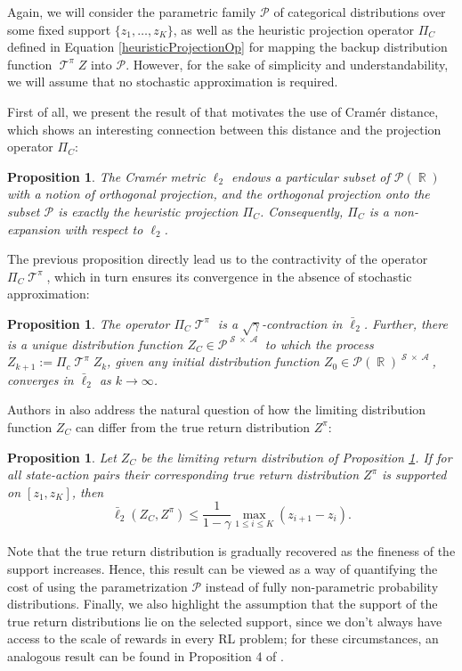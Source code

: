 \documentclass[12pt,a4paper,openright,twoside]{article}
\DeclareMathOperator*{\R}{\mathbb{R}}
\DeclareMathOperator*{\Sspace}{\mathcal{S}}
\DeclareMathOperator*{\A}{\mathcal{A}}
\DeclareMathOperator*{\T}{\mathcal{T}}
\numberwithin{equation}{section}
\newtheorem{prop}[theorem]{Proposition}
\theoremstyle{definition}
\theoremstyle{remark}
\theoremstyle{plain}
\begin{document}
Again, we will consider the parametric family $\mathcal{P}$ of categorical distributions over some fixed support $\{z_1, \dots , z_K\}$, as well as the heuristic projection operator $\Pi_C$ defined in Equation \ref{heuristicProjectionOp} for mapping the backup distribution function $\T^\pi Z$ into $\mathcal{P}$. However, for the sake of simplicity and understandability, we will assume that no stochastic approximation is required. 

First of all, we present the result of \cite{analysisC51} that motivates the use of Cramér distance, which shows an interesting connection between this distance and the projection operator $\Pi_C$:
\begin{prop} \label{CramerProj}
	The Cramér metric $\ell_2$ endows a particular subset of $\mathscr{P}(\R)$ with a notion of orthogonal projection, and the orthogonal projection onto the subset $\mathcal{P}$ is exactly the heuristic projection $\Pi_C$. Consequently, $\Pi_C$ is a non-expansion with respect to $\ell_2$.
\end{prop}

The previous proposition directly lead us to the contractivity of the operator $\Pi_C \T^\pi$, which in turn ensures its convergence in the absence of stochastic approximation:
\begin{prop} \label{CramerBellmanContraction}
	The operator $\Pi_C \T^\pi$ is a $\sqrt{\gamma}$-contraction in $\bar{\ell}_2$. Further, there is a unique distribution function $Z_C \in \mathcal{P}^{\Sspace \times \A}$ to which the process $Z_{k+1} := \Pi_c \T^\pi Z_k$, given any initial distribution function $Z_0 \in \mathscr{P}(\R)^{\Sspace \times \A}$, converges in $\bar{\ell}_2$ as $k \rightarrow \infty$.
\end{prop}

Authors in \cite{analysisC51} also address the natural question of how the limiting distribution function $Z_C$ can differ from the true return distribution $Z^\pi$:
\begin{prop}
	Let $Z_C$ be the limiting return distribution of Proposition \ref{CramerBellmanContraction}. If for all state-action pairs their corresponding true return distribution $Z^\pi$ is supported on $[z_1,z_K]$, then 
	$$\bar{\ell}_2(Z_C, Z^\pi) \leq \frac{1}{1-\gamma} \max_{1\leq i \leq K} (z_{i+1}-z_i). $$
\end{prop}
Note that the true return distribution is gradually recovered as the fineness of the support increases. Hence, this result can be viewed as a way of quantifying the cost of using the parametrization $\mathcal{P}$ instead of fully non-parametric probability distributions. Finally, we also highlight the assumption that the support of the true return distributions lie on the selected support, since we don't always have access to the scale of rewards in every RL problem; for these circumstances, an analogous result can be found in Proposition 4 of \cite{analysisC51}.
\end{document}
